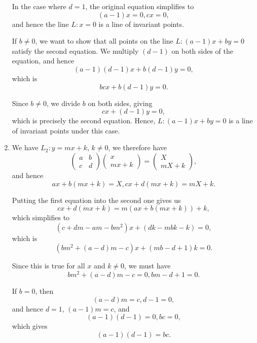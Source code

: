 \begin{enumerate}
          In the case where \(d = 1\), the original equation simplifies to
          \[
              (a - 1)x = 0, cx = 0,
          \]
          and hence the line \(L: x = 0\) is a line of invariant points.

          If \(b \neq 0\), we want to show that all points on the line \(L: (a - 1)x + by = 0\) satisfy the second equation. We multiply \((d - 1)\) on both sides of the equation, and hence
          \[
              (a - 1)(d - 1)x + b (d - 1)y = 0,
          \]
          which is
          \[
              bcx + b(d - 1)y = 0.
          \]

          Since \(b \neq 0\), we divide \(b\) on both sides, giving
          \[
              cx + (d - 1)y = 0,
          \]
          which is precisely the second equation. Hence, \(L: (a - 1)x + by = 0\) is a line of invariant points under this case.

    \item We have \(L_2: y = mx + k\), \(k \neq 0\), we therefore have
          \[
              \begin{pmatrix}
                  a & b \\
                  c & d
              \end{pmatrix}
              \begin{pmatrix}
                  x \\
                  mx + k
              \end{pmatrix}
              =
              \begin{pmatrix}
                  X \\
                  mX + k
              \end{pmatrix},
          \]
          and hence
          \[
              ax + b(mx + k) = X, cx + d(mx + k) = mX + k.
          \]

          Putting the first equation into the second one gives us
          \[
              cx + d(mx + k) = m(ax + b(mx + k)) + k,
          \]
          which simplifies to
          \[
              (c + dm - am - bm^2)x + (dk - mbk - k) = 0,
          \]
          which is
          \[
              (bm^2 + (a - d)m - c)x + (mb - d + 1)k = 0.
          \]

          Since this is true for all \(x\) and \(k \neq 0\), we must have
          \[
              bm^2 + (a - d)m - c = 0, bm - d + 1 = 0.
          \]

          If \(b = 0\), then
          \[
              (a - d)m = c, d - 1 = 0,
          \]
          and hence \(d = 1\), \((a - 1)m = c\), and
          \[
              (a - 1)(d - 1) = 0, bc = 0,
          \]
          which gives
          \[
              (a - 1)(d - 1) = bc.
          \]


\end{enumerate}
